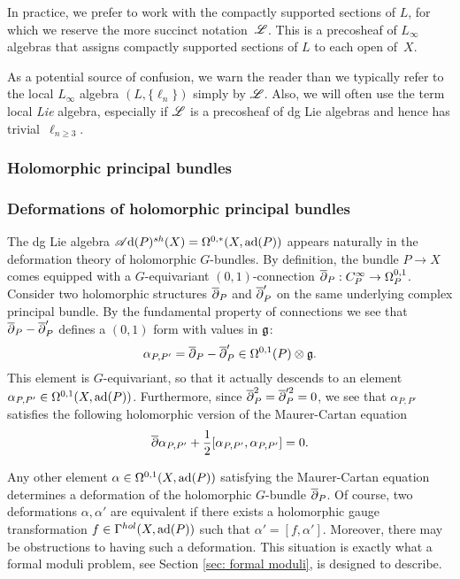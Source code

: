 \documentclass[10pt]{amsart}
\def\sAd{\sA{\rm d}}
\begin{document}
In practice, we prefer to work with the compactly supported sections of $L$, for which we reserve the more succinct notation~$\mathscr L$.
This is a precosheaf of $L_\infty$ algebras that assigns compactly supported sections of $L$ to each open of~$X$.

As a potential source of confusion, we warn the reader than we typically refer to the local $L_\infty$ algebra $(L, \{\ell_n\})$ simply by $\mathscr L$. 
Also, we will often use the term local {\em Lie} algebra, especially if $\mathscr L$ is a precosheaf of dg Lie algebras and hence has trivial~$\ell_{n \geq 3}$.

\subsubsection{Holomorphic principal bundles}

 
\subsubsection{Deformations of holomorphic principal bundles}

The dg Lie algebra $\sAd(P)^{sh}(X) = \Omega^{0,*}(X, \ad(P))$ appears naturally in the deformation theory of holomorphic $G$-bundles. 
By definition, the bundle $P \to X$ comes equipped with a $G$-equivariant $(0,1)$-connection $\overline{\partial}_P : C^\infty_P \to \Omega^{0,1}_P$. 
Consider two holomorphic structures $\overline{\partial}_P$ and $\overline{\partial}_P'$ on the same underlying complex principal bundle. 
By the fundamental property of connections we see that $\overline{\partial}_P - \overline{\partial}_P'$ defines a $(0,1)$ form with values in $\mathfrak g$:
\[
\alpha_{P,P'} = \overline{\partial}_P - \overline{\partial}_P' \in \Omega^{0,1}(P) \otimes \mathfrak g .
\]
This element is $G$-equivariant, so that it actually descends to an element $\alpha_{P,P'} \in \Omega^{0,1}(X, {\rm ad}(P))$. 
Furthermore, since $\overline{\partial}_P^2 = \overline{\partial}_P'^2 = 0$, we see that $\alpha_{P,P'}$ satisfies the following holomorphic version of the Maurer-Cartan equation
\[
\overline{\partial} \alpha_{P,P'} + \frac{1}{2} [\alpha_{P,P'}, \alpha_{P,P'}] = 0 .
\]

Any other element $\alpha \in \Omega^{0,1}(X, {\rm ad}(P))$ satisfying the Maurer-Cartan equation determines a deformation of the holomorphic $G$-bundle $\overline{\partial}_P$.
Of course, two deformations $\alpha,\alpha'$ are equivalent if there exists a holomorphic gauge transformation $f \in \Gamma^{hol}(X, {\rm ad}(P))$ such that $\alpha' = [f, \alpha']$. 
Moreover, there may be obstructions to having such a deformation. 
This situation is exactly what a formal moduli problem, see Section \ref{sec: formal moduli}, is designed to describe.
\end{document}
